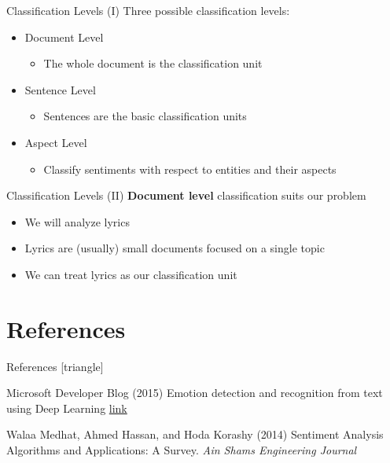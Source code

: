 \documentclass[xcolor=dvipsnames]{beamer}
\begin{document}
\begin{frame}{Classification Levels (I)}
Three possible classification levels:
\begin{itemize}
\item Document Level 
\begin{itemize}
\item The whole document is the classification unit
\end{itemize}
\item Sentence Level
\begin{itemize}
\item Sentences are the basic classification units
\end{itemize}
\item Aspect Level
\begin{itemize}
\item Classify sentiments with respect to entities and their aspects
\end{itemize}
\end{itemize}
\end{frame}

\begin{frame}{Classification Levels (II)}
\textbf{Document level} classification suits our problem
\begin{itemize}
\item We will analyze lyrics
\item Lyrics are (usually) small documents focused on a single topic
\item We can treat lyrics as our classification unit
\end{itemize}
\end{frame}


\section{References}
\begin{frame}{References}
[triangle]
 \begin{thebibliography}{99} %
 Microsoft Developer Blog (2015)
\newblock Emotion detection and recognition from text using Deep Learning
\newblock \href{https://www.microsoft.com/developerblog/2015/11/29/emotion-detection-and-recognition-from-text-using-deep-learning/}{link}

 Walaa Medhat, Ahmed Hassan, and Hoda Korashy (2014)
\newblock Sentiment Analysis Algorithms and Applications: A Survey.
\newblock \emph{Ain Shams Engineering Journal}

\end{thebibliography}

\end{frame}
\end{document}
